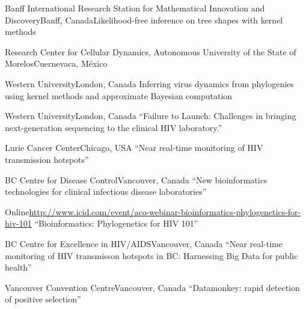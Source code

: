 {Banff International Research Station for Mathematical Innovation and Discovery}{Banff, Canada}{Likelihood-free inference on tree shapes with kernel methods}

{Research Center for Cellular Dynamics, Autonomous University of the State of Morelos}{Cuernevaca, M\'exico}
{}

{Western University}{London, Canada}
{Inferring virus dynamics from phylogenies using kernel methods and approximate Bayesian computation}

{Western University}{London, Canada}
{``Failure to Launch: Challenges in bringing next-generation sequencing to the clinical HIV laboratory.''}

{}

{Lurie Cancer Center}{Chicago, USA}
{``Near real-time monitoring of HIV transmission hotspots''}

{BC Centre for Disease Control}{Vancouver, Canada}
{``New bioinformatics technologies for clinical infectious disease laboratories''}

{Online}{\url{http://www.icid.com/event/aco-webinar-bioinformatics-phylogenetics-for-hiv-101}}
{``Bioinformatics: Phylogenetics for HIV 101''}

{BC Centre for Excellence in HIV/AIDS}{Vancouver, Canada}
{``Near real-time monitoring of HIV transmisson hotspots in BC: Harnessing Big Data for public health''}

{Vancouver Convention Centre}{Vancouver, Canada}
{``Datamonkey: rapid detection of positive selection''}

